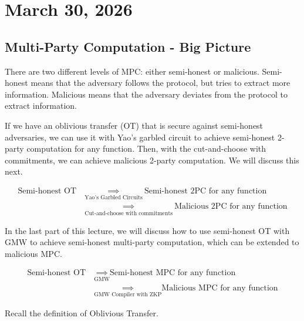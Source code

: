 \section{March 30, 2026}
\label{20260330}

\subsection{Multi-Party Computation - Big Picture}

There are two different levels of MPC: either semi-honest or malicious. Semi-honest means that the adversary follows the protocol, but tries to extract more information. Malicious means that the adversary deviates from the protocol to extract information.

If we have an oblivious transfer (OT) that is secure against semi-honest adversaries, we can use it with Yao's garbled circuit to achieve semi-honest 2-party computation for any function. Then, with the cut-and-choose with commitments, we can achieve malicious 2-party computation. We will discuss this next.

\begin{align*}
    \text{Semi-honest OT}\ & \underset{\text{Yao's Garbled Circuits}}{\implies}\ \text{Semi-honest 2PC for any function} \\
    & \underset{\text{Cut-and-choose with commitments}}{\implies}\ \text{Malicious 2PC for any function}
\end{align*}

In the last part of this lecture, we will discuss how to use semi-honest OT with GMW to achieve semi-honest multi-party computation, which can be extended to malicious MPC.

\begin{align*}
    \text{Semi-honest OT} \ & \underset{\text{GMW}}{\implies} \text{Semi-honest MPC for any function}\\
    & \underset{\text{GMW Compiler with ZKP}}{\implies} \text{Malicious MPC for any function}
\end{align*}

Recall the definition of Oblivious Transfer.

